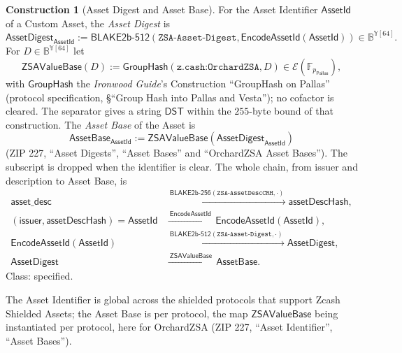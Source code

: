 \documentclass[11pt,a4paper]{article}
\theoremstyle{definition}
\newtheorem{construction}[theorem]{Construction}
\newcommand{\F}{\mathbb{F}}
\newcommand{\Pallas}{\ensuremath{\mathsf{Pallas}}}
\newcommand{\Ep}{\ensuremath{\mathcal{E}}}
\newcommand{\GroupHash}{\ensuremath{\mathsf{GroupHash}}}
\begin{document}
\begin{construction}[Asset Digest and Asset Base]\label{def:assetbase}
For the Asset Identifier $\mathsf{AssetId}$ of a Custom Asset, the
\emph{Asset Digest} is
\[
  \mathsf{AssetDigest}_{\mathsf{AssetId}} := \mathsf{BLAKE2b\text{-}512}(
    \texttt{ZSA-Asset-Digest}, \mathsf{EncodeAssetId}(\mathsf{AssetId}))
  \in \mathbb{B}^{\mathbb{Y}[64]}.
\]
For $D \in \mathbb{B}^{\mathbb{Y}[64]}$ let
\[
  \mathsf{ZSAValueBase}(D) := \GroupHash(\texttt{z.cash:OrchardZSA}, D)
  \in \Ep(\F_{p_{\Pallas}}),
\]
with $\GroupHash$ the \emph{Ironwood Guide}'s Construction ``GroupHash on
Pallas'' (protocol specification, \S``Group Hash into Pallas and Vesta'');
no cofactor is cleared. The separator gives a string $\mathsf{DST}$ within
the $255$-byte bound of that construction. The \emph{Asset Base} of the
Asset is
\[
  \mathsf{AssetBase}_{\mathsf{AssetId}} :=
    \mathsf{ZSAValueBase}(\mathsf{AssetDigest}_{\mathsf{AssetId}})
\]
(ZIP 227, ``Asset Digests'', ``Asset Bases'' and ``OrchardZSA Asset
Bases''). The subscript is dropped when the identifier is clear. The whole
chain, from issuer and description to Asset Base, is
\begin{align*}
  \mathsf{asset\_desc}
  &\xrightarrow{\ \mathsf{BLAKE2b\text{-}256}(\texttt{ZSA-AssetDescCRH},
    \cdot)\ } \mathsf{assetDescHash}, \\
  (\mathsf{issuer}, \mathsf{assetDescHash}) = \mathsf{AssetId}
  &\xrightarrow{\ \mathsf{EncodeAssetId}\ }
  \mathsf{EncodeAssetId}(\mathsf{AssetId}), \\
  \mathsf{EncodeAssetId}(\mathsf{AssetId})
  &\xrightarrow{\ \mathsf{BLAKE2b\text{-}512}(\texttt{ZSA-Asset-Digest},
    \cdot)\ } \mathsf{AssetDigest}, \\
  \mathsf{AssetDigest}
  &\xrightarrow{\ \mathsf{ZSAValueBase}\ } \mathsf{AssetBase}.
\end{align*}
Class: specified.
\end{construction}

The Asset Identifier is global across the shielded protocols that support
Zcash Shielded Assets; the Asset Base is per protocol, the map
$\mathsf{ZSAValueBase}$ being instantiated per protocol, here for OrchardZSA
(ZIP 227, ``Asset Identifier'', ``Asset Bases'').
\end{document}
